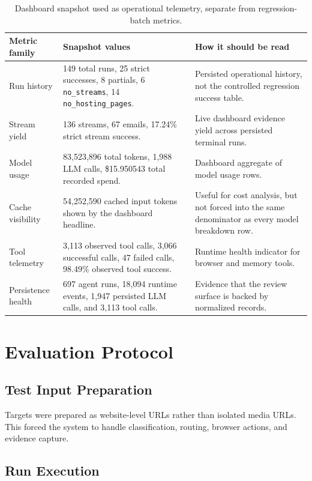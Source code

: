 \begin{table}[!htbp]
\centering
\begin{tabularx}{\textwidth}{Q{3.6cm}Y Y}
\toprule
{}
Metric family & Snapshot values & How it should be read \\
\midrule
Run history & 149 total runs, 25 strict successes, 8 partials, 6
\texttt{no\_streams}, 14 \texttt{no\_hosting\_pages}. & Persisted operational
history, not the controlled regression success table. \\
Stream yield & 136 streams, 67 emails, 17.24\% strict stream success. & Live
dashboard evidence yield across persisted terminal runs. \\
Model usage & 83,523,896 total tokens, 1,988 LLM calls, \$15.950543 total
recorded spend. & Dashboard aggregate of model usage rows. \\
Cache visibility & 54,252,590 cached input tokens shown by the dashboard
headline. & Useful for cost analysis, but not forced into the same denominator
as every model breakdown row. \\
Tool telemetry & 3,113 observed tool calls, 3,066 successful calls, 47 failed
calls, 98.49\% observed tool success. & Runtime health indicator for browser
and memory tools. \\
Persistence health & 697 agent runs, 18,094 runtime events, 1,947 persisted
LLM calls, and 3,113 tool calls. & Evidence that the review surface is backed
by normalized records. \\
\bottomrule
\end{tabularx}
\caption{Dashboard snapshot used as operational telemetry, separate from regression-batch metrics.}
\label{tab:dashboard-snapshot}
\end{table}

\section{Evaluation Protocol}

\subsection{Test Input Preparation}

Targets were prepared as website-level URLs rather than isolated media URLs.
This forced the system to handle classification, routing, browser actions, and
evidence capture.

\subsection{Run Execution}

